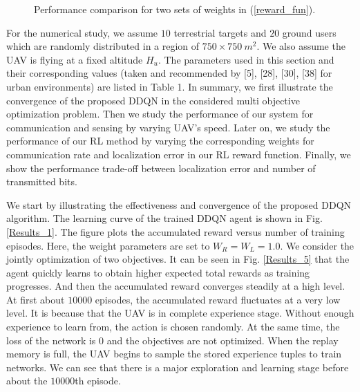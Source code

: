 \documentclass[journal,twocolumn]{IEEEtran}
\begin{document}
{\begin{figure}[t]
\begin{tabular}{ccc}
\end{tabular}
\caption{Performance comparison for two sets of weights in (\ref{reward_fun}).} \label{Results_4}
\end{figure}



For the numerical study, we assume $10$ terrestrial targets and $20$ ground users which are randomly distributed in a region of $750 \times 750 \ m^2$. We also assume the UAV is flying at a fixed altitude $H_u$. The parameters used in this section and their corresponding values (taken and recommended by [5], [28], [30], [38] for urban environments) are listed in Table 1. In summary, we first illustrate the convergence of the proposed DDQN in the considered multi objective optimization problem. Then we study the performance of our system for communication and sensing  by varying UAV’s speed. Later on, we study the performance of our RL method by varying the corresponding weights for communication rate and localization error in our RL reward function. Finally, we show the performance trade-off between localization error and number of transmitted bits.







We start by illustrating the effectiveness and convergence of the proposed DDQN algorithm. The learning curve of the trained DDQN agent is shown in Fig. \ref{Results_1}. The figure plots the accumulated reward versus number of training episodes. Here, the weight parameters are set to $W_R = W_L = 1.0$. We consider the jointly optimization of two objectives. It can be seen in Fig. \ref{Results_5} that the agent quickly learns to obtain higher expected total rewards as training progresses. And then the accumulated reward converges steadily at a high level. At first about $10000$ episodes, the accumulated reward fluctuates at a very low level. It is because that the UAV is in complete experience stage. Without enough experience to learn from, the action is chosen randomly. At the same time, the loss of the network is 0 and the objectives are not optimized. When the replay memory is full, the UAV begins to sample the stored experience tuples to train networks. We can see that there is a major exploration and learning stage before about
the $10000$th episode.


}
\end{document}
